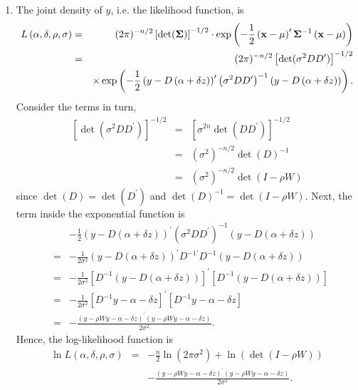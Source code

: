 \documentclass{article}
\begin{document}
\begin{solution}
\begin{enumerate}
\item The joint density of $y$, i.e. the likelihood function, is%
\begin{eqnarray*}
L\left( \alpha ,\delta ,\rho ,\sigma \right)  &=&(2\pi )^{-n/2}\left[ \det (%
\mathbf{\Sigma })\right] ^{-1/2}\cdot \exp \left( -\frac{1}{2}\left( \mathbf{%
x}-\mathbf{\mu }\right) ^{\prime }\mathbf{\Sigma }^{-1}\left( \mathbf{x}-%
\mathbf{\mu }\right) \right)  \\
&=&(2\pi )^{-n/2}\left[ \det (\sigma ^{2}DD^{\prime })\right] ^{-1/2} \\
&&\times \exp \left( -\frac{1}{2}\left( y-D\left( \alpha +\delta z\right)
\right) ^{\prime }\left( \sigma ^{2}DD^{\prime }\right) ^{-1}\left(
y-D\left( \alpha +\delta z\right) \right) \right) .
\end{eqnarray*}%
Consider the terms in turn,%
\begin{eqnarray*}
\left[ \det (\sigma ^{2}DD^{\prime })\right] ^{-1/2} &=&\left[ \sigma
^{2n}\det \left( DD^{\prime }\right) \right] ^{-1/2} \\
&=&\left( \sigma ^{2}\right) ^{-n/2}\det \left( D\right) ^{-1} \\
&=&\left( \sigma ^{2}\right) ^{-n/2}\det (I-\rho W)
\end{eqnarray*}%
since $\det (D)=\det (D^{\prime })$ and $\det (D)^{-1}=\det (I-\rho W)$.
Next, the term inside the exponential function is%
\begin{eqnarray*}
&&-\frac{1}{2}\left( y-D\left( \alpha +\delta z\right) \right) ^{\prime
}\left( \sigma ^{2}DD^{\prime }\right) ^{-1}\left( y-D\left( \alpha +\delta
z\right) \right)  \\
&=&-\frac{1}{2\sigma ^{2}}\left( y-D\left( \alpha +\delta z\right) \right)
^{\prime }D^{-1\prime }D^{-1}\left( y-D\left( \alpha +\delta z\right)
\right)  \\
&=&-\frac{1}{2\sigma ^{2}}\left[ D^{-1}\left( y-D\left( \alpha +\delta
z\right) \right) \right] ^{\prime }\left[ D^{-1}\left( y-D\left( \alpha
+\delta z\right) \right) \right]  \\
&=&-\frac{1}{2\sigma ^{2}}\left[ D^{-1}y-\alpha -\delta z\right] ^{\prime }%
\left[ D^{-1}y-\alpha -\delta z\right]  \\
&=&-\frac{\left( y-\rho Wy-\alpha -\delta z\right) ^{\prime }\left( y-\rho
Wy-\alpha -\delta z\right) }{2\sigma ^{2}}.
\end{eqnarray*}%
Hence, the log-likelihood function is%
\begin{eqnarray*}
\ln L\left( \alpha ,\delta ,\rho ,\sigma \right)  &=&-\frac{n}{2}\ln \left(
2\pi \sigma ^{2}\right) +\ln \left( \det \left( I-\rho W\right) \right)  \\
&&-\frac{\left( y-\rho Wy-\alpha -\delta z\right) ^{\prime }\left( y-\rho
Wy-\alpha -\delta z\right) }{2\sigma ^{2}}.
\end{eqnarray*}


\end{enumerate}
\end{solution}
\end{document}
